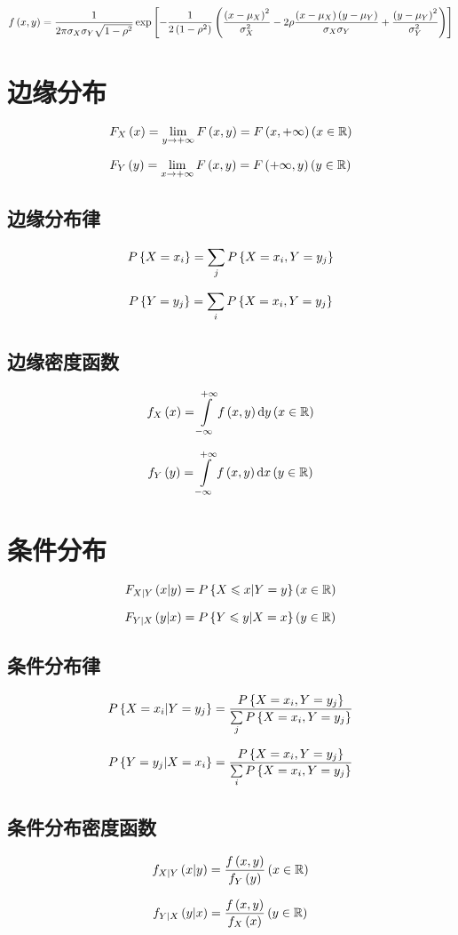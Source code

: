 \documentclass{article}
\begin{document}
\[f\left(x,y\right)=\frac1{2\pi\sigma_X\sigma_Y\sqrt{1-\rho^2}}
    \exp\left[-\frac1{2\left(1-\rho^2\right)}
        \left(\frac{{\left(x-\mu_X\right)}^2}{\sigma_X^2}
            -2\rho\frac{\left(x-\mu_X\right)\left(y-\mu_Y\right)}{\sigma_X\sigma_Y}
            +\frac{{\left(y-\mu_Y\right)}^2}{\sigma_Y^2}\right)\right]\]

\section{边缘分布}

\[F_X\left(x\right)=\lim_{y\to+\infty}F\left(x,y\right)=F\left(x,+\infty\right)\left(x\in\mathbb R\right)\]

\[F_Y\left(y\right)=\lim_{x\to+\infty}F\left(x,y\right)=F\left(+\infty,y\right)\left(y\in\mathbb R\right)\]

\subsection{边缘分布律}

\[P\left\{X=x_i\right\}=\sum_jP\left\{X=x_i,Y=y_j\right\}\]

\[P\left\{Y=y_j\right\}=\sum_iP\left\{X=x_i,Y=y_j\right\}\]

\subsection{边缘密度函数}

\[f_X\left(x\right)=\int\limits_{-\infty}^{+\infty}f\left(x,y\right)\mathrm d y\left(x\in\mathbb R\right)\]

\[f_Y\left(y\right)=\int\limits_{-\infty}^{+\infty}f\left(x,y\right)\mathrm d x\left(y\in\mathbb R\right)\]

\section{条件分布}

\[F_{X|Y}\left(x|y\right)=P\left\{X\leqslant x|Y=y\right\}\left(x\in\mathbb R\right)\]

\[F_{Y|X}\left(y|x\right)=P\left\{Y\leqslant y|X=x\right\}\left(y\in\mathbb R\right)\]

\subsection{条件分布律}

\[P\left\{X=x_i|Y=y_j\right\}=\frac{P\left\{X=x_i,Y=y_j\right\}}{\sum\limits_jP\left\{X=x_i,Y=y_j\right\}}\]

\[P\left\{Y=y_j|X=x_i\right\}=\frac{P\left\{X=x_i,Y=y_j\right\}}{\sum\limits_iP\left\{X=x_i,Y=y_j\right\}}\]

\subsection{条件分布密度函数}

\[f_{X|Y}\left(x|y\right)=\frac{f\left(x,y\right)}{f_Y\left(y\right)}\left(x\in\mathbb R\right)\]

\[f_{Y|X}\left(y|x\right)=\frac{f\left(x,y\right)}{f_X\left(x\right)}\left(y\in\mathbb R\right)\]
\end{document}
